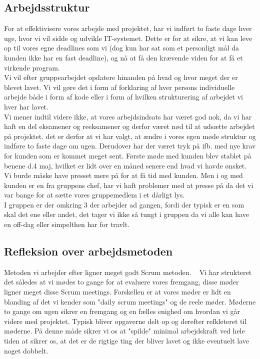 \documentclass[a4paper]{article}
\begin{document}
\subsection{Arbejdsstruktur}
For at effektivisere vores arbejde med projektet, har vi indført to faste dage hver uge, hvor vi vil sidde og udvikle IT-systemet. Dette er for at sikre, at vi kan leve op til vores egne deadlines som vi (dog kun har sat som et personligt mål da kunden ikke har en fast deadline), og nå at få den krævende viden for at få et virkende program.\\
Vi vil efter gruppearbejdet opdatere hinanden på hvad og hvor meget der er blevet lavet. Vi vil gøre det i form af forklaring af hver persons individuelle arbejde både i form af kode eller i form af hvilken strukturering af arbejdet vi hver har lavet.\\
Vi mener indtil videre ikke, at vores arbejdsindsats har været god nok, da vi har haft en del eksamener og reeksamener og derfor været nød til at udsætte arbejdet på projektet. det er derfor at vi har valgt, at ændre i vores egen møde struktur og indføre to faste dage om ugen.
Derudover har der været tryk på ifb. med nye krav for kunden som er kommet meget sent. Første møde med kunden blev stablet på benene d.4 maj, hvilket er lidt over en måned senere end hvad vi havde ønsket. Vi burde  måske have presset mere på for at få tid med kunden. Men i og med kunden er en fra gruppens chef, har vi haft problemer med at presse på da det vi var bange for at sætte vores gruppemedlem i et dårligt lys.\\
I gruppen er der omkring 3 der arbejder ad gangen, fordi der typisk er en som skal det ene eller andet, det tager vi ikke så tungt i gruppen da vi alle kan have en off-dag eller simpelthen har for travlt.\\
\subsection{Refleksion over arbejdsmetoden}
Metoden vi arbejder efter ligner meget godt Scrum metoden. ~\cite{Scrum} Vi har strukteret det således at vi mødes to gange for at evaluere vores fremgang, disse møder ligner meget disse Scrum meetings. Forskellen er at vores møder er lidt en blanding af det vi kender som "daily scrum meetings" og de reele møder. Møderne to gange om ugen sikrer en fremgang og en fælles enighed om hvordan vi går videre med projektet. Typisk bliver opgaverne delt op og derefter refkleteret til møderne. På denne måde sikrer vi os at "spilde" minimal arbejdskraft ved hele tiden at sikrer os, at det er de rigtige ting der bliver lavet og ikke eventuelt lave noget dobbelt.
\newpage
\end{document}
